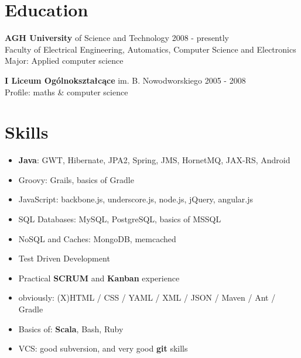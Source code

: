 \documentclass{res}
\begin{document}
\begin{resume}
\section{Education} 
{\bf AGH University} of Science and Technology \hfill 2008 - presently\\
	Faculty of Electrical Engineering, Automatics, Computer Science and Electronics\\
	Major: Applied computer science

{\bf I Liceum Ogólnokształcące} im. B. Nowodworskiego \hfill 2005 - 2008\\
	Profile: maths \& computer science

\section{Skills}
\begin{itemize}
 \item \textbf{Java}: GWT, Hibernate, JPA2, Spring, JMS, HornetMQ, JAX-RS, Android
 \item Groovy: Grails, basics of Gradle
 \item JavaScript: backbone.js, underscore.js, node.js, jQuery, angular.js
 \item SQL Databases: MySQL, PostgreSQL, basics of MSSQL
 \item NoSQL and Caches: MongoDB, memcached
 \item Test Driven Development
 \item Practical \textbf{SCRUM} and \textbf{Kanban} experience
 \item obviously: (X)HTML / CSS / YAML / XML / JSON / Maven / Ant / Gradle
 \item Basics of: \textbf{Scala}, Bash, Ruby
 \item VCS: good subversion, and very good \textbf{git} skills
\end{itemize}


\end{resume}
\end{document}
